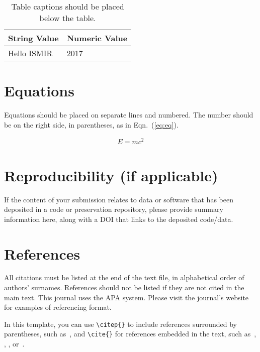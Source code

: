 \documentclass{article}
\begin{document}
\begin{table}[htpb]
\centering
  \begin{tabular}{ll}
  \toprule
  \bfseries String Value & \bfseries Numeric Value \\ \midrule
  Hello ISMIR  & 2017          \\
  \bottomrule
  \end{tabular}
  \caption{Table captions should be placed below the table.}
\label{tab:table}
\end{table}

\section{Equations}\label{sec:equations}

Equations should be placed on separate lines and numbered.
The number should be on the right side, in parentheses,
as in Eqn.~(\ref{eq:eq}).

\begin{align}\label{eq:eq}
E = mc^2
\end{align}

\section{Reproducibility (if applicable)}

If the content of your submission relates to data or software
that has been deposited in a code or preservation repository,
please provide summary information here, along with a DOI that
links to the deposited code/data.



\section{References}

All citations must be listed at the end of the text file,
in alphabetical order of authors' surnames.
References should not be listed if they are not cited in
the main text.
This journal uses the APA system.
Please visit the journal's website
for examples of referencing format.

In this template, you can use \verb=\citep{}= to include references
surrounded by parentheses, such as~\citep{KneesS16_MusicSimilarityRetrieval_SPRINGER}, and \verb=\cite{}=
for references embedded in the text,
such as~\cite{WeihsJVR16_MusicDataAnalysis_CRC},
\cite{SerraEtAl13_RoadmapMIR_CreativeCommon},
\cite{Lerch15_AudioContentAnalysis_WILEY},
or~\cite{Mueller15_FMP_SPRINGER}.
\end{document}
